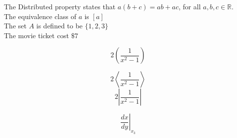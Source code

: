 \documentclass[12pt]{article}
\begin{document}
The Distributed property states that $a(b+c)=ab+ac$, for all $a,b,c \in \mathbb{R}$.\\[6pt]
The equivalence class of $a$ is $[a]$\\[6pt]

The set $A$ is defined to be $\{1,2,3\}$\\[6pt]


The movie ticket cost $\$7$

$$2\left(\frac{1}{x^2-1}\right)$$

$$2\left \langle\frac{1}{x^2-1} \right\rangle$$
$$2\left|\frac{1}{x^2-1}\right|$$

$$\left.\frac{dx}{dy}\right|_{x_3}$$
\end{document}
